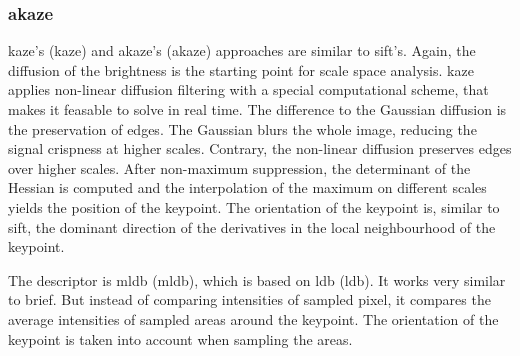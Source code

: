 \subsubsection{\acrshort{akaze}}

\acrshort{kaze}'s\cite{alcantarilla_eccv12} (\acrlong{kaze}) and \acrshort{akaze}\cite{alcantarilla_bmva13}'s (\acrlong{akaze}) approaches are similar to \acrshort{sift}'s.
Again, the diffusion of the brightness is the starting point for scale space analysis.
\acrshort{kaze} applies non-linear diffusion filtering with a special computational scheme, that makes it feasable to solve in real time.
The difference to the Gaussian diffusion is the preservation of edges.
The Gaussian blurs the whole image, reducing the signal crispness at higher scales.
Contrary, the non-linear diffusion preserves edges over higher scales.
After non-maximum suppression, the determinant of the Hessian is computed and the interpolation of the maximum on different scales yields the position of the keypoint.
The orientation of the keypoint is, similar to \acrshort{sift}, the dominant direction of the derivatives in the local neighbourhood of the keypoint.

The descriptor is \acrshort{mldb} (\acrlong{mldb}), which is based on \acrshort{ldb}\cite{yang_ismar12} (\acrlong{ldb}).
It works very similar to \acrshort{brief}.
But instead of comparing intensities of sampled pixel, it compares the average intensities of sampled areas around the keypoint.
The orientation of the keypoint is taken into account when sampling the areas.
